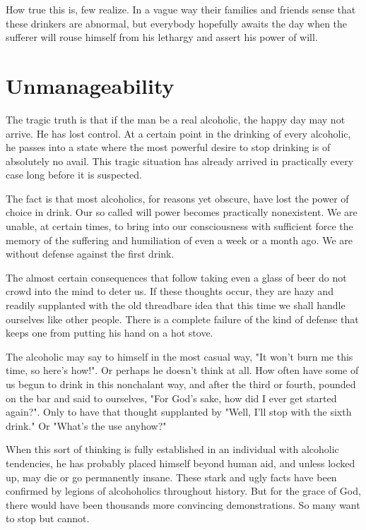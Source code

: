 How true this is, few realize. 
In a vague way their families and friends sense that these drinkers are abnormal, 
but everybody hopefully awaits the day when the sufferer will rouse himself from his lethargy and assert his power of will.


\section{Unmanageability}

The tragic truth is that if the man be a real alcoholic, the happy day may not arrive. 
He has lost control. 
At a certain point in the drinking of every alcoholic, he passes into a state where the most powerful desire to stop drinking is of absolutely no avail. 
This tragic situation has already arrived in practically every case long before it is suspected.

The fact is that most alcoholics, for reasons yet obscure, have lost the power of choice in drink. 
Our so called will power becomes practically nonexistent. 
We are unable, at certain times, to bring into our consciousness with sufficient force the memory of the suffering and humiliation of even a week or a month ago. 
We are without defense against the first drink.

The almost certain consequences that follow taking even a glass of beer do not crowd into the mind to deter us. 
If these thoughts occur, they are hazy and readily supplanted with the old threadbare idea that this time we shall handle ourselves like other people. 
There is a complete failure of the kind of defense that keeps one from putting his hand on a hot stove.

The alcoholic may say to himself in the most casual way, 
"It won't burn me this time, so here's how!". 
Or perhaps he doesn't think at all. 
How often have some of us begun to drink in this nonchalant way, 
and after the third or fourth, pounded on the bar and said to ourselves, 
"For God's sake, how did I ever get started again?". 
Only to have that thought supplanted by 
"Well, I'll stop with the sixth drink." 
Or "What's the use anyhow?"

When this sort of thinking is fully established in an individual with alcoholic tendencies, he has probably placed himself beyond human aid, 
and unless locked up, may die or go permanently insane. 
These stark and ugly facts have been confirmed by legions of alcohoholics throughout history. 
But for the grace of God, there would have been thousands more convincing demonstrations. 
So many want to stop but cannot.


